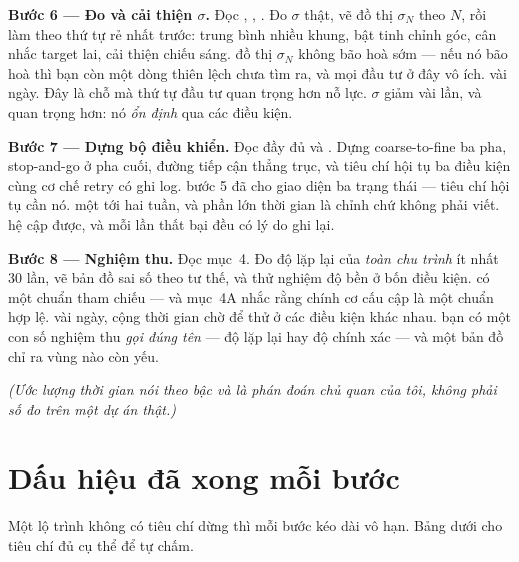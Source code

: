\documentclass[../../marker.tex]{subfiles}
\begin{document}
\begin{mach}
\item {}
\gp \textbf{Bước 6 --- Đo và cải thiện \(\sigma\).} Đọc , , . Đo \(\sigma\) thật, vẽ đồ thị \(\sigma_N\) theo \(N\), rồi làm theo thứ tự rẻ nhất trước: trung bình nhiều khung, bật tinh chỉnh góc, cân nhắc target lai, cải thiện chiếu sáng.
\gd đồ thị \(\sigma_N\) không bão hoà sớm --- nếu nó bão hoà thì bạn còn một dòng thiên lệch chưa tìm ra, và mọi đầu tư ở đây vô ích.
\gia vài ngày. Đây là chỗ mà thứ tự đầu tư quan trọng hơn nỗ lực.
\hq \(\sigma\) giảm vài lần, và quan trọng hơn: nó \emph{ổn định} qua các điều kiện.

\item {}
\gp \textbf{Bước 7 --- Dựng bộ điều khiển.} Đọc  đầy đủ và . Dựng coarse-to-fine ba pha, stop-and-go ở pha cuối, đường tiếp cận thẳng trục, và tiêu chí hội tụ ba điều kiện cùng cơ chế retry có ghi log.
\gd bước 5 đã cho giao diện ba trạng thái --- tiêu chí hội tụ cần nó.
\gia một tới hai tuần, và phần lớn thời gian là chỉnh chứ không phải viết.
\hq hệ cập được, và mỗi lần thất bại đều có lý do ghi lại.

\item {}
\gp \textbf{Bước 8 --- Nghiệm thu.} Đọc  mục~4. Đo độ lặp lại của \emph{toàn chu trình} ít nhất 30 lần, vẽ bản đồ sai số theo tư thế, và thử nghiệm độ bền ở bốn điều kiện.
\gd có một chuẩn tham chiếu --- và  mục~4A nhắc rằng chính cơ cấu cập là một chuẩn hợp lệ.
\gia vài ngày, cộng thời gian chờ để thử ở các điều kiện khác nhau.
\hq bạn có một con số nghiệm thu \emph{gọi đúng tên} --- độ lặp lại hay độ chính xác --- và một bản đồ chỉ ra vùng nào còn yếu.
\end{mach}

\emph{(Ước lượng thời gian nói theo bậc và là phán đoán chủ quan của tôi, không phải số đo trên một dự án thật.)}

\section{Dấu hiệu đã xong mỗi bước}

Một lộ trình không có tiêu chí dừng thì mỗi bước kéo dài vô hạn. Bảng dưới cho tiêu chí đủ cụ thể để tự chấm.
\end{document}
